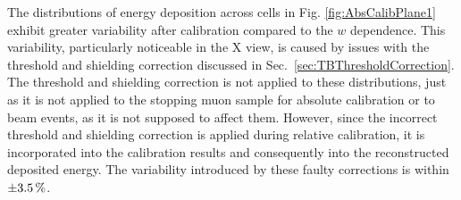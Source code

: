 The distributions of energy deposition across cells in Fig. \ref{fig:AbsCalibPlane1} exhibit greater variability after calibration compared to the $w$ dependence. This variability, particularly noticeable in the X view, is caused by issues with the threshold and shielding correction discussed in Sec.~\ref{sec:TBThresholdCorrection}. The threshold and shielding correction is not applied to these distributions, just as it is not applied to the stopping muon sample for absolute calibration or to beam events, as it is not supposed to affect them. However, since the incorrect threshold and shielding correction is applied during relative calibration, it is incorporated into the calibration results and consequently into the reconstructed deposited energy. The variability introduced by these faulty corrections is within $\pm\unit[3.5]{\%}$.


